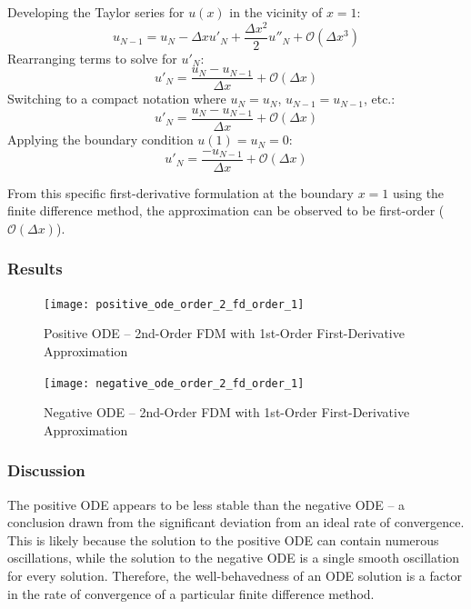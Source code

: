 \documentclass[10pt, reqno]{article}		%
\numberwithin{equation}{section}
\begin{document}
Developing the Taylor series for $u(x)$ in the vicinity of $x = 1$:
\begin{equation}
u_{N-1} = u_N - \Delta x u'_N + \frac{\Delta x^2}{2} u''_N + \mathcal{O}(\Delta x^3)
\end{equation}
Rearranging terms to solve for $u'_N$:
\begin{equation}
u'_N = \frac{u_N - u_{N-1}}{\Delta x} + \mathcal{O}(\Delta x)
\end{equation}
Switching to a compact notation where $u_N = u_N$, $u_{N-1} = u_{N-1}$, etc.:
\begin{equation}
u'_N = \frac{u_N - u_{N-1}}{\Delta x} + \mathcal{O}(\Delta x)
\end{equation}
Applying the boundary condition $u(1) = u_N = 0$:
\begin{equation}
u'_N = \frac{- u_{N-1}}{\Delta x} + \mathcal{O}(\Delta x)
\end{equation}

From this specific first-derivative formulation at the boundary $x = 1$ using the finite difference method, the approximation can be observed to be first-order ($\mathcal{O}(\Delta x)$).

\subsubsection{Results}

\begin{figure}[H]
	\begin{center}
		\texttt{[image: positive\_ode\_order\_2\_fd\_order\_1]}
		\caption{Positive ODE -- 2nd-Order FDM with 1st-Order First-Derivative Approximation}
	\end{center}
\end{figure}

\begin{figure}[H]
	\begin{center}
		\texttt{[image: negative\_ode\_order\_2\_fd\_order\_1]}
		\caption{Negative ODE -- 2nd-Order FDM with 1st-Order First-Derivative Approximation}
	\end{center}
\end{figure}

\subsubsection{Discussion}

The positive ODE appears to be less stable than the negative ODE -- a conclusion drawn from the significant deviation from an ideal rate of convergence. This is likely because the solution to the positive ODE can contain numerous oscillations, while the solution to the negative ODE is a single smooth oscillation for every solution. Therefore, the well-behavedness of an ODE solution is a factor in the rate of convergence of a particular finite difference method.
\end{document}
